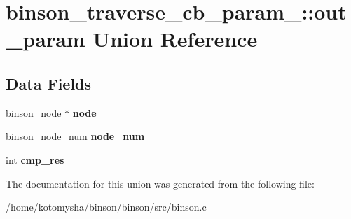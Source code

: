 \hypertarget{unionbinson__traverse__cb__param___1_1out__param}{\section{binson\-\_\-traverse\-\_\-cb\-\_\-param\-\_\-\-:\-:out\-\_\-param Union Reference}
\label{unionbinson__traverse__cb__param___1_1out__param}
}
\subsection*{Data Fields}
\begin{DoxyCompactItemize}
\item 
\hypertarget{unionbinson__traverse__cb__param___1_1out__param_af5caab93926a0186cdd0a92b3e6a677a}{binson\-\_\-node $\ast$ {\bfseries node}}\label{unionbinson__traverse__cb__param___1_1out__param_af5caab93926a0186cdd0a92b3e6a677a}

\item 
\hypertarget{unionbinson__traverse__cb__param___1_1out__param_a07f44339262a7011688e6dca921443a3}{binson\-\_\-node\-\_\-num {\bfseries node\-\_\-num}}\label{unionbinson__traverse__cb__param___1_1out__param_a07f44339262a7011688e6dca921443a3}

\item 
\hypertarget{unionbinson__traverse__cb__param___1_1out__param_ac3e45ba418dc781f21007070144b5d6e}{int {\bfseries cmp\-\_\-res}}\label{unionbinson__traverse__cb__param___1_1out__param_ac3e45ba418dc781f21007070144b5d6e}

\end{DoxyCompactItemize}


The documentation for this union was generated from the following file\-:\begin{DoxyCompactItemize}
\item 
/home/kotomysha/binson/binson/src/binson.\-c\end{DoxyCompactItemize}
